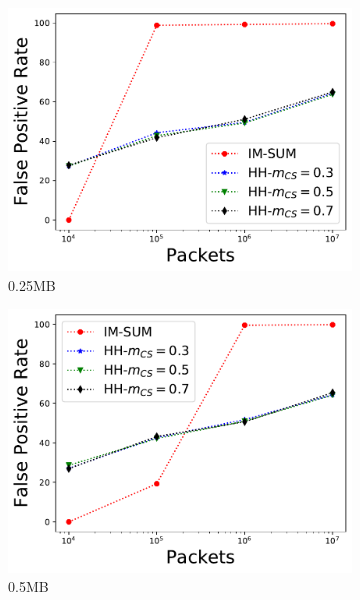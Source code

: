 \begin{figure}
\begin{subfigure}[t]{0.32\textwidth}
    \includegraphics[width=\linewidth]{HH/figures/FPR_per_pkts_m=0.25.pdf}
    \caption{0.25MB}
    \label{fig:fig3_d}
\end{subfigure}\hfill
\begin{subfigure}[t]{0.32\textwidth}
    \includegraphics[width=\linewidth]{HH/figures/FPR_per_pkts_m=0.5.pdf}
    \caption{0.5MB}
    \label{fig:fig3_e}
\end{subfigure}\hfill
\begin{subfigure}[t]{0.32\textwidth}

\end{subfigure}
\end{figure}
